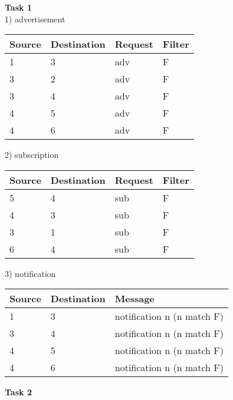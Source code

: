 \setlength{\parindent}{0pt}\textbf{\huge Task 1}\\ 

1) advertisement
\begin{center}
\begin{tabular}{|l|l|l|l|}
\hline
Source & Destination & Request & Filter \\ \hline
1      & 3           & adv     & F      \\ \hline
3      & 2           & adv     & F      \\ \hline
3      & 4           & adv     & F      \\ \hline
4      & 5           & adv     & F      \\ \hline
4      & 6           & adv     & F      \\ \hline
\end{tabular}
\end{center}

2) subscription
\begin{center}
\begin{tabular}{|l|l|l|l|}
\hline
Source & Destination & Request & Filter \\ \hline
5      & 4           & sub     & F      \\ \hline
4      & 3           & sub     & F      \\ \hline
3      & 1           & sub     & F      \\ \hline
6      & 4           & sub     & F      \\ \hline
\end{tabular}
\end{center}

3) notification
\begin{center}
\begin{tabular}{|l|l|l|}
\hline
Source & Destination & Message                    \\ \hline
1      & 3           & notification n (n match F) \\ \hline
3      & 4           & notification n (n match F) \\ \hline
4      & 5           & notification n (n match F) \\ \hline
4      & 6           & notification n (n match F) \\ \hline
\end{tabular}
\end{center}

\setlength{\parindent}{0pt}\textbf{\huge Task 2}\\

